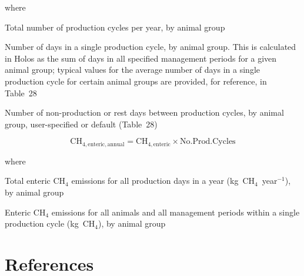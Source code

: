 \noindent where
\begin{description}[font=\normalfont, leftmargin=9em, style=sameline, nosep]
    \item[$\mathrm{No.Prod.Cycles}$] Total number of production cycles per year,
          by animal group
    \item[$\mathrm{No.Days}_{\mathrm{Cycle}}$] Number of days in a single production
          cycle, by animal group. This is calculated in Holos as the sum of days in
          all specified management periods for a given animal group; typical values for
          the average number of days in a single production cycle for certain animal
          groups are provided, for reference, in Table~28
    \item[$\mathrm{No.Days}_{\mathrm{Rest}}$] Number of non-production or rest days
          between production cycles, by animal group, user-specified or default
          (Table~28)
\end{description}

\begin{equation}
    \mathrm{CH}_{4,\mathrm{enteric,annual}} =
        \mathrm{CH}_{4,\mathrm{enteric}} \times \mathrm{No.Prod.Cycles}
    \tag{Eq.\ 3.5.1.2}
\end{equation}

\noindent where
\begin{description}[font=\normalfont, leftmargin=9em, style=sameline, nosep]
    \item[$\mathrm{CH}_{4,\mathrm{enteric,annual}}$] Total enteric CH$_4$ emissions
          for all production days in a year (kg~CH$_4$~year$^{-1}$), by animal group
    \item[$\mathrm{CH}_{4,\mathrm{enteric}}$] Enteric CH$_4$ emissions for all animals
          and all management periods within a single production cycle (kg~CH$_4$), by
          animal group
\end{description}

\section{References}
\label{sec:enteric-refs}

